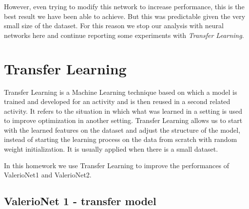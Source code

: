 \documentclass[12pt]{article}
\begin{document}
However, even trying to modify this network to increase performance, this is the best result we have been able to achieve. But this was predictable given the very small size of the dataset. For this reason we stop our analysis  with neural networks here and continue reporting some experiments with {\em Transfer Learning}.

\newpage
\section{Transfer Learning}
Transfer Learning is a Machine Learning technique based on which a model is trained and developed for an activity and is then reused in a second related activity. It refers to the situation in which what was learned in a setting is used to improve optimization in another setting. Transfer Learning allows us to start with the learned features on the dataset and adjust the structure of the model, instead of starting the learning process on the data from scratch with random weight initialization. It is usually applied when there is a small dataset.

In this homework we use Transfer Learning to improve the performances of ValerioNet1 and ValerioNet2.

\subsection{ValerioNet 1 - transfer model}
\end{document}
